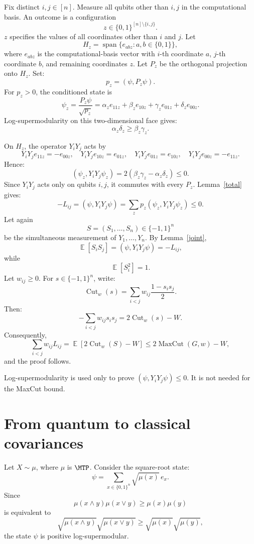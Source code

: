 \documentclass[12pt,reqno]{amsart}
\makeatletter
\renewenvironment{proof}[1][\proofname]{%
  \par\vspace{\topsep}%
  \normalfont\topsep6\p@\@plus6\p@\relax
  \trivlist
  \item[\hskip\labelsep\itshape #1\@addpunct{.}]\ignorespaces
}{%
  \endtrivlist
}
\numberwithin{equation}{section}
\DeclareMathOperator{\E}{\mathbb{E}}
\makeatother
\begin{document}
\begin{proof}
Fix distinct \(i,j\in[n]\). 
Measure all qubits other than \(i,j\)
in the computational basis.
An outcome is a configuration
\[
z\in\{0,1\}^{[n]\setminus\{i,j\}}.
\]
\(z\) specifies the values of all coordinates
other than \(i\) and \(j\). Let
\[
H_z
=
\operatorname{span}\{e_{abz}:a,b\in\{0,1\}\},
\]
where \(e_{abz}\) is the computational-basis vector
with \(i\)-th coordinate \(a\),
\(j\)-th coordinate \(b\),
and remaining coordinates \(z\).
Let \(P_z\) be the orthogonal projection onto \(H_z\).
Set:
\[
p_z=(\psi,P_z\psi).
\]
For \(p_z>0\), the conditioned state is
\begin{equation}\label{psi_z}
\psi_z
=
\frac{P_z\psi}{\sqrt{p_z}}
=
\alpha_z e_{11z}
+\beta_z e_{10z}
+\gamma_z e_{01z}
+\delta_z e_{00z}.
\end{equation}
Log-supermodularity on this two-dimensional face gives:
\[
\alpha_z\delta_z
\ge
\beta_z\gamma_z.
\]
\smallskip%

On \(H_z\), the operator \(Y_iY_j\) acts by
\[
Y_iY_j e_{11z}=-e_{00z},
\quad
Y_iY_j e_{10z}=e_{01z},
\quad
Y_iY_j e_{01z}=e_{10z},
\quad
Y_iY_j e_{00z}=-e_{11z}.
\]
Hence:
\[
(\psi_z,Y_iY_j\psi_z)
=
2(\beta_z\gamma_z-\alpha_z\delta_z)
\le0.
\]
Since \(Y_iY_j\) acts only on qubits \(i,j\),
it commutes with every \(P_z\). Lemma~\ref{total} gives:
\[
-L_{ij}
=
(\psi,Y_iY_j\psi)
=
\sum_z
p_z(\psi_z,Y_iY_j\psi_z)
\le0.
\]
Let again
\[
S=(S_1,\ldots,S_n)\in\{-1,1\}^n
\]
be the simultaneous measurement of 
\(Y_1, \ldots, Y_n\). By Lemma~\ref{joint},
\[
\E[S_iS_j]
=
(\psi,Y_iY_j\psi)
=
-L_{ij},
\]
while
\[
\E[S_i^2]=1.
\]
Let \(w_{ij}\ge0\). For \(s\in\{-1,1\}^n\), write:
\[
\operatorname{Cut}_w(s)
=
\sum_{i<j}
w_{ij}\frac{1-s_is_j}{2}.
\]
Then:
\[
-\sum_{i<j}w_{ij}s_is_j
=
2\operatorname{Cut}_w(s)-W.
\]
Consequently,
\[
\sum_{i<j}w_{ij}L_{ij} = 
\E\!\left[
2\operatorname{Cut}_w(S)-W
\right] \le 2\operatorname{MaxCut}(G,w)-W,
\]
and the proof follows.
\end{proof}
\begin{remark}
Log-supermodularity is used only to 
prove \((\psi,Y_iY_j\psi)\le0\). It is not needed for the MaxCut bound.
\end{remark}

\section{From quantum to classical covariances} \label{classical}
Let \(X\sim\mu\), where \(\mu\) 
is \(\MTP\). Consider the square-root state:
\[
\psi
=
\sum_{x\in\{0,1\}^n}
\sqrt{\mu(x)}\,e_x.
\]
Since
\[
\mu(x\wedge y)\mu(x\vee y)
\ge
\mu(x)\mu(y)
\]
is equivalent to
\[
\sqrt{\mu(x\wedge y)}
\sqrt{\mu(x\vee y)}
\ge
\sqrt{\mu(x)}
\sqrt{\mu(y)},
\]
the state \(\psi\) is positive 
log-supermodular.
\smallskip%
\end{document}
